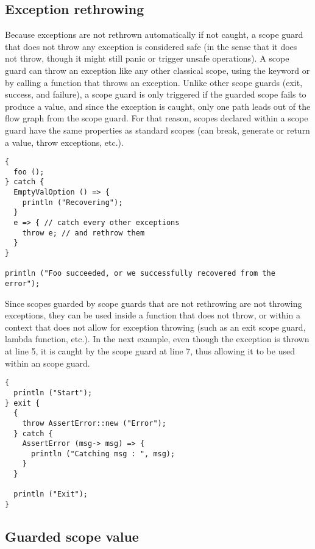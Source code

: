 \subsection{Exception rethrowing}

Because exceptions are not rethrown automatically if not caught, a 
scope guard that does not throw any exception is considered safe (in the sense
that it does not throw, though it might still panic or trigger unsafe
operations). A  scope guard can throw an exception like any other
classical scope, using the keyword  or by calling a function that
throws an exception. Unlike other scope guards (exit, success, and failure), a
 scope guard is only triggered if the guarded scope fails to
produce a value, and since the exception is caught, only one path leads out of
the flow graph from the scope guard. For that reason, scopes declared within a
 scope guard have the same properties as standard scopes (can
break, generate or return a value, throw exceptions, etc.).


\begin{lstlisting}[style=coloredverbatim]
{
  foo ();
} catch {
  EmptyValOption () => {
    println ("Recovering");
  }
  e => { // catch every other exceptions
    throw e; // and rethrow them
  }
}

println ("Foo succeeded, or we successfully recovered from the error");
\end{lstlisting}

Since scopes guarded by  scope guards that are not rethrowing are
not throwing exceptions, they can be used inside a function that does not throw,
or within a context that does not allow for exception throwing (such as an exit
scope guard, lambda function, etc.). In the next example, even though the
exception  is thrown at line 5, it is caught by the scope
guard at line 7, thus allowing it to be used within an  scope guard.

\begin{lstlisting}[style=coloredverbatim]
{
  println ("Start");
} exit {
  {
    throw AssertError::new ("Error");
  } catch {
    AssertError (msg-> msg) => {
      println ("Catching msg : ", msg);
    }
  }

  println ("Exit");
}
\end{lstlisting}

\subsection{Guarded scope value}

